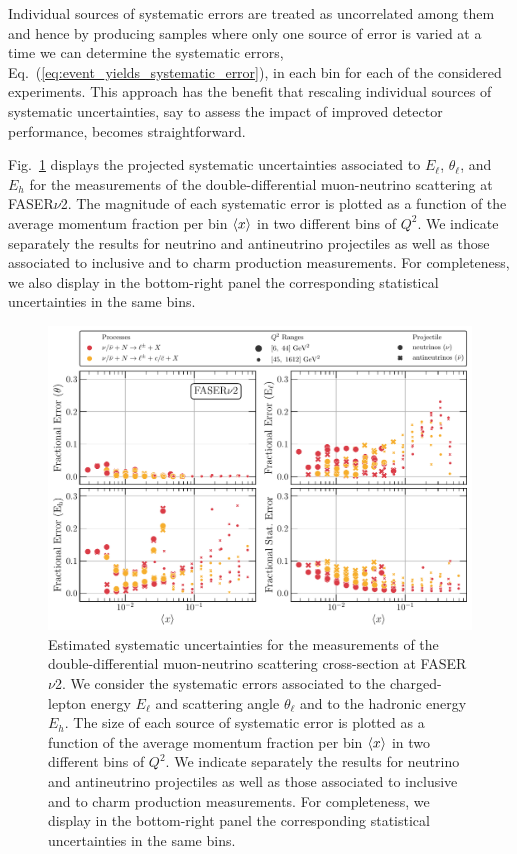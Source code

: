Individual sources of systematic errors are treated as uncorrelated among them and hence
by producing samples where only one source of error is varied at a time
we can determine the systematic errors, Eq.~(\ref{eq:event_yields_systematic_error}), in each bin
for each of the considered experiments.
%
This approach has the benefit that rescaling individual sources of systematic
uncertainties, say to assess the impact of improved detector performance,
becomes straightforward. 

Fig.~\ref{fig:percentage_uncertainties_overview}
displays the projected systematic uncertainties associated
to $E_\ell$, $\theta_\ell$, and $E_h$ 
for the  measurements of the double-differential
muon-neutrino scattering  at FASER$\nu$2.
%
The magnitude of each systematic error is plotted as a function
of the average momentum fraction per bin $\left\langle x\right\rangle$
in two different bins of $Q^2$.
%
We indicate separately the results for neutrino and antineutrino projectiles as well as
those associated to inclusive and to charm production measurements.
%
For completeness, we also display in the bottom-right panel the corresponding
statistical uncertainties in the same bins.

\begin{figure}[t]
  \centering
  \includegraphics[width=\textwidth]{plots/FASERv2_fractional_error.pdf}
  \caption{\small Estimated systematic uncertainties for the  measurements
    of the double-differential
    muon-neutrino scattering cross-section at FASER$\nu$2.
    We consider the systematic errors
    associated to the charged-lepton energy $E_\ell$ and scattering angle $\theta_\ell$
    and to the hadronic energy $E_h$.
    The size of each source of systematic error is plotted as a function
    of the average momentum fraction per bin $\left\langle x\right\rangle$
    in two different bins of $Q^2$.
    We indicate separately the results for neutrino and antineutrino projectiles as well as
    those associated to inclusive and to charm production measurements.
    For completeness, we display in the bottom-right panel the corresponding
    statistical uncertainties in the same bins.
  }
  \label{fig:percentage_uncertainties_overview}
\end{figure}

